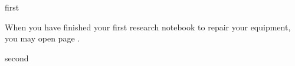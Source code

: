\documentclass[greennotebook]{guildcamp4} %
\begin{document}
\startnotebook{\nJamesVerBlood{}}

\begin{page}{first}

When you have finished your first research notebook to repair your equipment, you may open page .

\end{page}

\begin{page}{second}
\end{page}

\endnotebook
\end{document}
